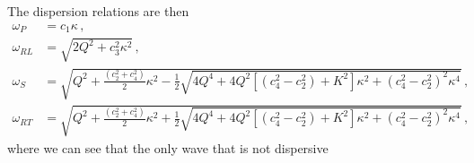 \documentclass[12pt]{article}
\begin{document}
The dispersion relations are then
\begin{align}
\omega_P &= c_1 \kappa\, ,\\
\omega_{RL} &= \sqrt{2Q^2 + c_3^2 \kappa^2}\, ,\\
\omega_S &= \sqrt{Q^{2} + \frac{(c_2^2 + c_4^2)}{2}\kappa^2 - \frac{1}{2} \sqrt{4Q^4 +
   4Q^2[(c_4^2 - c_2^2) + K^2]\kappa^2 + (c_4^2 - c_2^2)^2 \kappa^4}}\, ,\\
\omega_{RT} &= \sqrt{Q^{2} + \frac{(c_2^2 + c_4^2)}{2}\kappa^2 + \frac{1}{2} \sqrt{4Q^4 +
   4Q^2[(c_4^2 - c_2^2) + K^2]\kappa^2 + (c_4^2 - c_2^2)^2 \kappa^4}}\, ,
\end{align}
where we can see that the only wave that is not dispersive





\end{document}
